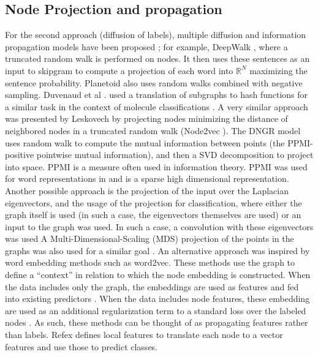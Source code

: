 \subsection*{Node Projection and propagation}
For the second approach (diffusion of labels), multiple diffusion and information propagation models have been proposed \cite{rosenfeld2017semi}; 
for example, DeepWalk \cite{perozzi2014deepwalk}, where a truncated random walk is performed on nodes. It then uses these sentences as an input to skipgram to compute a projection of each word into $\mathbb{R}^N$ maximizing the sentence probability.  
Planetoid \cite{yang2016revisiting} also uses random walks combined with negative sampling. Duvenaud et al .  used a translation of subgraphs to hash functions for a similar task in the context of molecule classifications \cite{duvenaud2015convolutional}. A very similar approach was presented by Leskovech by projecting nodes minimizing the distance of neighbored nodes in a truncated random walk (Node2vec \cite{grover2016node2vec}). The DNGR model \cite{cao2016deep} uses random walk to compute the mutual information between points (the PPMI-positive pointwise mutual information), and then a SVD decomposition to project into space. PPMI is a measure often used in information theory. PPMI was used for word  representations in \cite{levy2015improving} and is a sparse high dimensional representation. Another possible approach is the projection of the input over the Laplacian eigenvectors, and the usage of the projection for classification, where either the graph itself is used (in such a case, the eigenvectors themselves are used) or an input to the graph was used. In such a case, a convolution with these eigenvectors was used \cite{masci2015shapenet}\cite{Monti2017} A Multi-Dimensional-Scaling (MDS) projection of the points in the graphs was also used for a similar goal \cite{belkin2002laplacian}\cite{levy2015improving}. An alternative approach was inspired by word embedding methods \cite{mikolov2013distributed} such as word2vec. These methods use the graph to define a “context” in relation to which the node embedding is constructed. When the data includes only the graph, the embeddings are used as features and fed into existing predictors \cite{perozzi2014deepwalk}. When the data includes node features, these embedding are used as an additional regularization term to a standard loss over the labeled nodes \cite{thomas2016semi}\cite{yang2016revisiting}. As such, these methods can be thought of as propagating features rather than labels.  Refex \cite{henderson2011s} defines local features to translate each node to a vector features and use those to predict classes.

